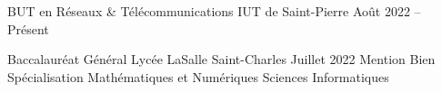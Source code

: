 

\cvevent
    {BUT en Réseaux \& Télécommunications}
    {IUT de Saint-Pierre}
    { Août 2022 -- Présent \hspace{1.25 cm}}{}

\cvevent
    {Baccalauréat Général}
    {Lycée LaSalle Saint-Charles}
    { Juillet 2022  \hspace{1.25 cm} Mention Bien}
    {}
{
    Spécialisation Mathématiques et Numériques Sciences Informatiques
}

\newcommand{\cvskillbar}[1]{
    \progressbar[
        heightr=1,
        width=3cm,
        ticksheight=0,
        filledcolor=Navy,
        linecolor=white,
        roundnessa=2pt]{#1}
}

\newcommand{\cvrow}[2]{
    \begin{row}[cellsep=0.5cm]{10}{2}%
        \begin{cell}{4}
            #1
        \end{cell}
        \begin{cell}{6}
            \cvskillbar{#2}
        \end{cell}
    \end{row}
}

\smallskip
\begin{spacing}{0.25}
\end{spacing}
    

\begin{spacing}{1.75}
\end{spacing}
